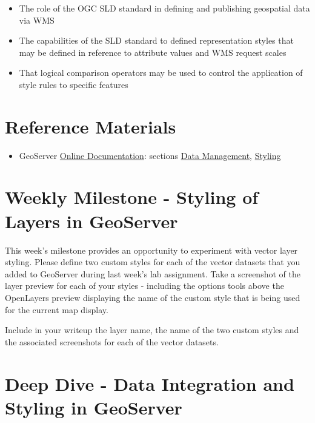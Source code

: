 \documentclass[]{book}
\providecommand{\tightlist}{%
  \setlength{\itemsep}{0pt}\setlength{\parskip}{0pt}}
\begin{document}
\begin{itemize}
\tightlist
\item
  The role of the OGC SLD standard in defining and publishing geospatial
  data via WMS
\item
  The capabilities of the SLD standard to defined representation styles
  that may be defined in reference to attribute values and WMS request
  scales
\item
  That logical comparison operators may be used to control the
  application of style rules to specific features
\end{itemize}

\section{Reference Materials}\label{week14-reference}

\begin{itemize}
\tightlist
\item
  GeoServer
  \href{http://docs.geoserver.org/stable/en/user/index.html}{Online
  Documentation}: sections
  \href{http://docs.geoserver.org/latest/en/user/data/index.html\#data}{Data
  Management},
  \href{http://docs.geoserver.org/latest/en/user/styling/index.html\#styling}{Styling}
\end{itemize}

\section{Weekly Milestone - Styling of Layers in
GeoServer}\label{weekly-milestone---styling-of-layers-in-geoserver}

This week's milestone provides an opportunity to experiment with vector
layer styling. Please define two custom styles for each of the vector
datasets that you added to GeoServer during last week's lab assignment.
Take a screenshot of the layer preview for each of your styles -
including the options tools above the OpenLayers preview displaying the
name of the custom style that is being used for the current map display.

Include in your writeup the layer name, the name of the two custom
styles and the associated screenshots for each of the vector datasets.

\section{Deep Dive - Data Integration and Styling in
GeoServer}\label{deep-dive---data-integration-and-styling-in-geoserver}
\end{document}
